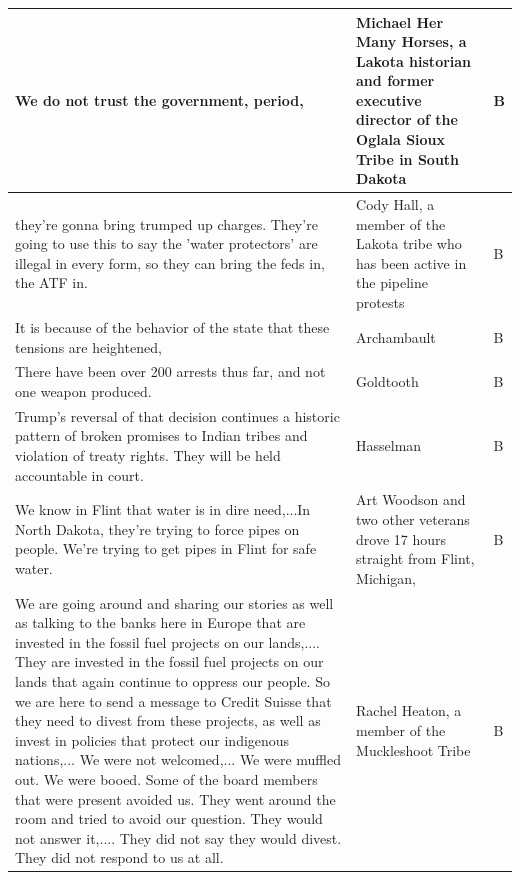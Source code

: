 \begin{footnotesize}
\begin{spacing}{1}
\begin{longtable}{| p{} | P{.25\textwidth} | p{.07\textwidth}|}
We do not trust the government, period,                                                             & Michael Her Many Horses, a Lakota historian and former executive director of the Oglala Sioux Tribe in South Dakota                                                                                & B              \\ \hline
they're gonna bring trumped up charges. They're going to use this to say the 'water protectors' are illegal in every form, so they can bring the feds in, the ATF in. & Cody Hall, a member of the Lakota tribe who has been active in the pipeline protests                           & B              \\ \hline
It is because of the behavior of the state that these tensions are heightened,                      & Archambault                                  & B              \\ \hline
There have been over 200 arrests thus far, and not one weapon produced.                             & Goldtooth                                    & B              \\ \hline
Trump's reversal of that decision continues a historic pattern of broken promises to Indian tribes and violation of treaty rights. They will be held accountable in court.                                                                                & Hasselman                                    & B              \\ \hline
We know in Flint that water is in dire need,...In North Dakota, they're trying to force pipes on people. We're trying to get pipes in Flint for safe water.           & Art Woodson and two other veterans drove 17 hours straight from Flint, Michigan,                               & B              \\ \hline
We are going around and sharing our stories as well as talking to the banks here in Europe that are invested in the fossil fuel projects on our lands,.... They are invested in the fossil fuel projects on our lands that again continue to oppress our people. So we are here to send a message to Credit Suisse that they need to divest from these projects, as well as invest in policies that protect our indigenous nations,... We were not welcomed,... We were muffled out. We were booed. Some of the board members that were present avoided us. They went around the room and tried to avoid our question. They would not answer it,.... They did not say they would divest. They did not respond to us at all. & Rachel Heaton, a member of the Muckleshoot Tribe                                                               & B              \\ \hline

\end{longtable}
\end{spacing}
\end{footnotesize}
